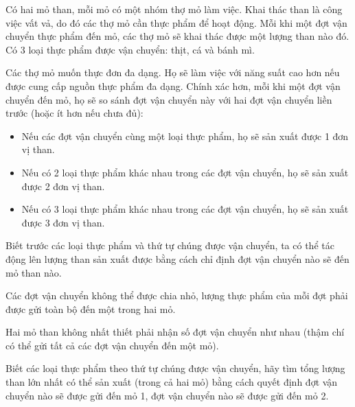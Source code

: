 Có hai mỏ than, mỗi mỏ có một nhóm thợ mỏ làm việc. Khai thác than là công việc vất vả, do đó các thợ mỏ cần thực phẩm để hoạt động. Mỗi khi một đợt vận chuyển thực phẩm đến mỏ, các thợ mỏ sẽ khai thác được một lượng than nào đó. Có 3 loại thực phẩm được vận chuyển: thịt, cá và bánh mì.  

   Các thợ mỏ muốn thực đơn đa dạng. Họ sẽ làm việc với năng suất cao hơn nếu được cung cấp nguồn thực phẩm đa dạng. Chính xác hơn, mỗi khi một đợt vận chuyển đến mỏ, họ sẽ so sánh đợt vận chuyển này với hai đợt vận chuyển liền trước (hoặc ít hơn nếu chưa đủ):  
\begin{itemize}
	\item     Nếu các đợt vận chuyển cùng một loại thực phẩm, họ sẽ sản xuất được 1 đơn vị than.   
	\item     Nếu có 2 loại thực phẩm khác nhau trong các đợt vận chuyển, họ sẽ sản xuất được 2 đơn vị than.   
	\item     Nếu có 3 loại thực phẩm khác nhau trong các đợt vận chuyển, họ sẽ sản xuất được 3 đơn vị than.   
\end{itemize}

   Biết trước các loại thực phẩm và thứ tự chúng được vận chuyển, ta có thể tác động lên lượng than sản xuất được bằng cách chỉ định đợt vận chuyển nào sẽ đến mỏ than nào.  

   Các đợt vận chuyển không thể được chia nhỏ, lượng thực phẩm của mỗi đợt phải được gửi toàn bộ đến một trong hai mỏ.  

   Hai mỏ than không nhất thiết phải nhận số đợt vận chuyển như nhau (thậm chí có thể gửi tất cả các đợt vận chuyển đến một mỏ).  

   Biết các loại thực phẩm theo thứ tự chúng được vận chuyển, hãy tìm tổng lượng than lớn nhất có thể sản xuất (trong cả hai mỏ) bằng cách quyết định đợt vận chuyển nào sẽ được gửi đến mỏ 1, đợt vận chuyển nào sẽ được gửi đến mỏ 2.  

\
